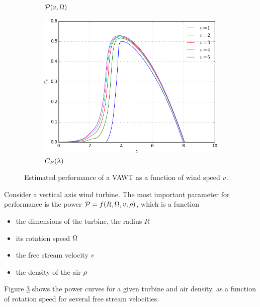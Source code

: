 \begin{figure}[!h]
\begin{subfigure}{0.37\textwidth}
    \caption{$\mathcal P(v,\Omega)$}
    \label{fig:vawtPower}
  \end{subfigure}
  \begin{subfigure}{0.35\textwidth}
    \includegraphics[width=\textwidth]{principles/vawtCp.png}
    \caption{$C_{\mathcal P}(\lambda)$}
    \label{fig:vawtCp}
  \end{subfigure}
  \caption{Estimated performance of a VAWT as a function of wind speed
    $v$.}
  \label{fig:vawtSimilarity}
\end{figure}

Consider a vertical axis wind turbine. The most important parameter
for performance is the power $\mathcal P = f(R,\Omega,v,\rho)$, which is
a function
\begin{itemize}
\item the dimensions of the turbine, \eg the radius $R$
\item its rotation speed $\Omega$
\item the free stream velocity $v$
\item the density of the air $\rho$
\end{itemize}
Figure \ref{fig:vawtSimilarity} shows the power curves for a given
turbine and air density, as a function of rotation speed for several
free stream velocities.

